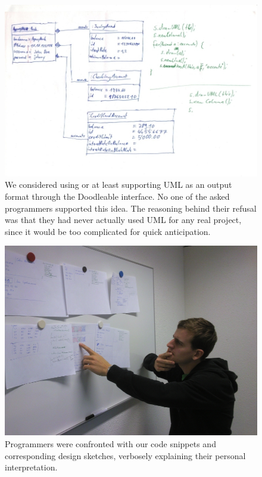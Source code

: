 \documentclass[english]{acm_proc_article-sp}
\begin{document}
\begin{figure}[h]
	\includegraphics[width=\linewidth]{img/sketches/006.jpg}
	\caption[Bad sketch example: UML]{We considered using or at least supporting UML as an output format through the Doodleable interface. 
No one of the asked programmers supported this idea. 
The reasoning behind their refusal was that they had never actually used UML for any real project, since it would be too complicated for quick anticipation.}
	\label{bad-sketch_uml}
\end{figure}

\begin{figure}[h]
	\includegraphics[width=\linewidth]{img/design-sketches_thinker.jpg}
	\caption[Confronting people with design sketches]{Programmers were confronted with our code snippets and corresponding design sketches, verbosely explaining their personal interpretation.}
	\label{sketch-discussion}
\end{figure}
\end{document}
